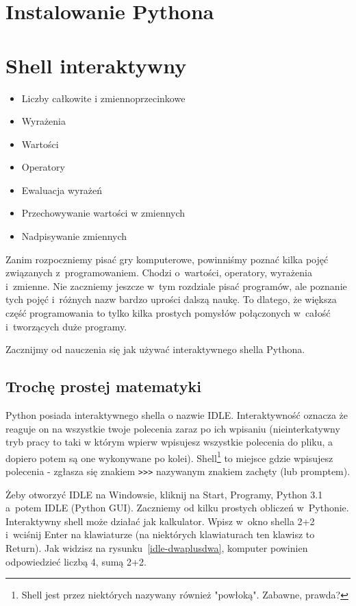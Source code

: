 \documentclass{book}
\newcommand{\btopicscovered}{
	\begin{graybox}
	\begin{itemize}
}
\newcommand{\etopicscovered}{
	\end{itemize}
	\end{graybox}
}
\begin{document}
\chapter{Instalowanie Pythona}

\chapter{Shell interaktywny}
\btopicscovered
	\item Liczby całkowite i zmiennoprzecinkowe
	\item Wyrażenia
	\item Wartości
	\item Operatory
	\item Ewaluacja wyrażeń
	\item Przechowywanie wartości w zmiennych
	\item Nadpisywanie zmiennych
\etopicscovered

Zanim rozpoczniemy pisać gry komputerowe, powinniśmy poznać kilka pojęć związanych z~programowaniem. Chodzi o~wartości, operatory, wyrażenia i~zmienne. Nie zaczniemy jeszcze w~tym rozdziale pisać programów, ale poznanie tych pojęć i~różnych nazw bardzo uprości dalszą naukę. To dlatego, że większa część programowania to tylko kilka prostych pomysłów połączonych w~całość i~tworzących duże programy.

Zacznijmy od nauczenia się jak używać interaktywnego shella Pythona.

\section{Trochę prostej matematyki}

Python posiada interaktywnego shella o nazwie IDLE. Interaktywność oznacza że reaguje on na wszystkie twoje polecenia zaraz po ich wpisaniu (nieinterkatywny tryb pracy to taki w którym wpierw wpisujesz wszystkie polecenia do pliku, a dopiero potem są one wykonywane po kolei). Shell\footnote{Shell jest przez niektórych nazywany również "powłoką". Zabawne, prawda?} to miejsce gdzie wpisujesz polecenia - zgłasza się znakiem \lstinline{>>>} nazywanym znakiem zachęty (lub promptem).

Żeby otworzyć IDLE na Windowsie, kliknij na Start, Programy, Python 3.1 a~potem IDLE (Python GUI). Zaczniemy od kilku prostych obliczeń w~Pythonie. Interaktywny shell może działać jak kalkulator. Wpisz w~okno shella 2+2 i~wciśnij Enter na klawiaturze (na niektórych klawiaturach ten klawisz to Return). Jak widzisz na rysunku~\ref{idle-dwaplusdwa}, komputer powinien odpowiedzieć liczbą 4, sumą 2+2.
\end{document}
